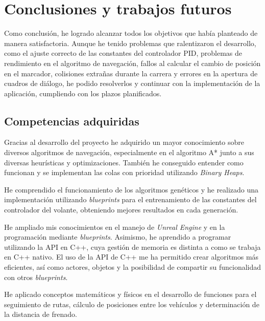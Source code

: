 

\chapter{Conclusiones y trabajos futuros}
Como conclusión, he logrado alcanzar todos los objetivos que había planteado de manera satisfactoria. Aunque he tenido problemas que ralentizaron el desarrollo, como el ajuste correcto de las constantes del controlador PID, problemas de rendimiento en el algoritmo de navegación, fallos al calcular el cambio de posición en el marcador, colisiones extrañas durante la carrera y errores en la apertura de cuadros de diálogo, he podido resolverlos y continuar con la implementación de la aplicación, cumpliendo con los plazos planificados.


\section{Competencias adquiridas}

Gracias al desarrollo del proyecto he adquirido un mayor conocimiento sobre diversos algoritmos de navegación, especialmente en el algoritmo A* junto a sus diversas heurísticas y optimizaciones. También he conseguido entender como funcionan y se implementan las colas con prioridad utilizando \textit{Binary Heaps}.

\bigskip
 
He comprendido el funcionamiento de los algoritmos genéticos y he realizado una implementación utilizando \textit{blueprints} para el entrenamiento de las constantes del controlador del volante, obteniendo mejores resultados en cada generación.

\bigskip

He ampliado mis conocimientos en el manejo de \textit{Unreal Engine} y en la programación mediante \textit{blueprints}. Asimismo, he aprendido a programar utilizando la API en C++, cuya gestión de memoria es distinta a como se trabaja en C++ nativo. El uso de la API de C++ me ha permitido crear algoritmos más eficientes, así como actores, objetos y la posibilidad de compartir su funcionalidad con otros \textit{blueprints}.

\bigskip

He aplicado conceptos matemáticos y físicos en el desarrollo de funciones para el seguimiento de rutas, cálculo de posiciones entre los vehículos y determinación de la distancia de frenado.

